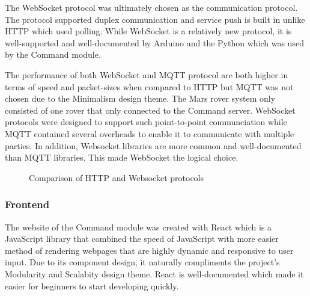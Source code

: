 \documentclass[11pt, a4paper]{article}
\begin{document}
The WebSocket protocol was ultimately chosen as the communication protocol. The protocol supported duplex communication and service push is built in unlike HTTP which used polling. While WebSocket is a relatively new protocol, it is well-supported and well-documented by Arduino and the Python which was used by the Command module. 

The performance of both WebSocket and MQTT protocol are both higher in terms of speed and packet-sizes when compared to HTTP but MQTT was not chosen due to the Minimalism design theme. The Mars rover system only consisted of one rover that only connected to the Command server. WebSocket protocols were designed to support such point-to-point communciation while MQTT contained several overheads to enable it to communicate with multiple parties. In addition, Websocket libraries are more common and well-documented than MQTT libraries. This made WebSocket the logical choice.
\begin{figure}[!h]
    \centering
    \hfill
    \caption{Comparison of HTTP and Websocket protocols \cite{SocketvsHTTP}}
\end{figure}

\subsubsection{Frontend}

The website of the Command module was created with React which is a JavaScript library that combined the speed of JavaScript with more easier method of rendering webpages that are highly dynamic and responsive to user input. Due to its component design, it naturally compliments the project's Modularity and Scalabity design theme. React is well-documented which made it easier for beginners to start developing quickly.    
\end{document}
